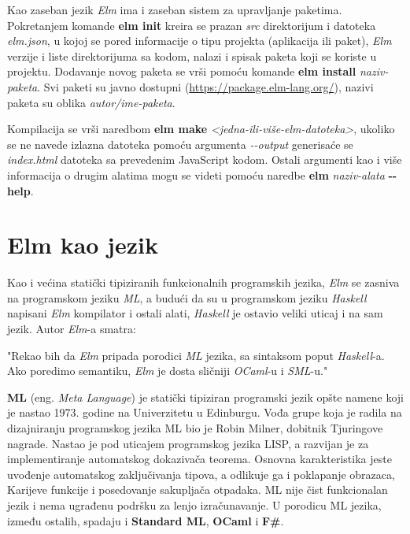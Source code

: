 \documentclass[12pt,oneside]{memoir}
\begin{document}
 
Kao zaseban jezik \emph{Elm} ima i zaseban sistem za upravljanje paketima.
Pokretanjem komande \textbf{elm init} kreira se prazan \emph{src} direktorijum i 
datoteka \emph{elm.json}, u kojoj se pored informacije o tipu projekta (aplikacija ili 
paket), \emph{Elm} verzije i liste direktorijuma sa kodom, nalazi i spisak paketa koji se 
koriste u projektu. Dodavanje novog paketa se vrši pomoću komande \textbf{elm install} 
\emph{naziv-paketa}. Svi paketi su javno dostupni (\url{https://package.elm-lang.org/}),
nazivi paketa su oblika \emph{autor/ime-paketa}.

Kompilacija se vrši naredbom \textbf{elm make} \emph{<jedna-ili-više-elm-datoteka>},
ukoliko se ne navede izlazna datoteka pomoću argumenta \emph{-{}-output} generisaće 
se \emph{index.html} datoteka sa prevedenim JavaScript kodom. Ostali argumenti kao i
više informacija o drugim alatima mogu se videti pomoću naredbe \textbf{elm}
\emph{naziv-alata} \textbf{-{}-help}.

\section{Elm kao jezik}
Kao i većina statički tipiziranih funkcionalnih programskih jezika, \emph{Elm} se zasniva na
programskom jeziku \emph{ML}, a budući da su u programskom jeziku \emph{Haskell} napisani \emph{Elm} kompilator
i ostali alati, \emph{Haskell} je ostavio veliki uticaj i na sam jezik. Autor \emph{Elm}-a smatra:
\begin{displayquote}
"Rekao bih da \emph{Elm} pripada porodici \emph{ML} jezika, sa sintaksom poput \emph{Haskell}-a. Ako poredimo semantiku,
\emph{Elm} je dosta sličniji \emph{OCaml}-u i \emph{SML}-u." \cite{eczaplicki:2015}
\end{displayquote}

\textbf{ML} (eng. \emph{Meta Language})\cite{ml} je statički tipiziran programski jezik opšte 
namene koji je nastao 1973. godine na Univerzitetu u Edinburgu. Vođa grupe koja je radila
na dizajniranju programskog jezika ML bio je Robin Milner, dobitnik Tjuringove nagrade.
Nastao je pod uticajem programskog jezika LISP, a razvijan je za implementiranje automatskog
dokazivača teorema. Osnovna karakteristika jeste uvođenje automatskog zaključivanja tipova, a
odlikuje ga i poklapanje obrazaca, Karijeve funkcije i posedovanje sakupljača otpadaka. ML
nije čist funkcionalan  jezik i nema ugrađenu podršku za lenjo izračunavanje. U porodicu ML 
jezika, između ostalih, spadaju i \textbf{Standard ML}, \textbf{OCaml} i \textbf{F{\#}}.
\end{document}
